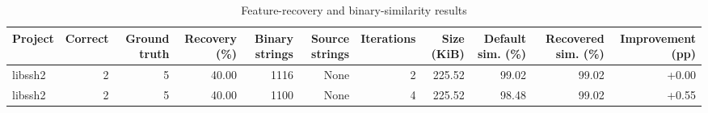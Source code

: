 \begin{table}[htbp]
\centering
\caption{Feature-recovery and binary-similarity results}
\label{tab:feature-recovery-results}
\small
\begin{tabular}{lrrrrrrrrrr}
\toprule
Project & Correct & Ground truth & Recovery (\%) & Binary strings & Source strings & Iterations & Size (KiB) & Default sim. (\%) & Recovered sim. (\%) & Improvement (pp) \\
\midrule
libssh2 & 2 & 5 & 40.00 & 1116 & None & 2 & 225.52 & 99.02 & 99.02 & +0.00 \\
libssh2 & 2 & 5 & 40.00 & 1100 & None & 4 & 225.52 & 98.48 & 99.02 & +0.55 \\
\bottomrule
\end{tabular}
\end{table}
